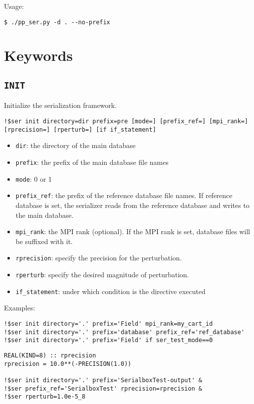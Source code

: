 \documentclass{article}
\begin{document}
Usage:
\begin{lstlisting}
$ ./pp_ser.py -d . --no-prefix
\end{lstlisting}

\section{Keywords}

\subsection{\texttt{INIT}}
Initialize the serialization framework.

\begin{lstlisting}
!$ser init directory=dir prefix=pre [mode=] [prefix_ref=] [mpi_rank=] [rprecision=] [rperturb=] [if if_statement]
\end{lstlisting}

\begin{itemize}
\item \texttt{dir}: the directory of the main database
\item \texttt{prefix}: the prefix of the main database file names
\item \texttt{mode}: 0 or 1
\item \texttt{prefix\_ref}: the prefix of the reference database file names. If reference database is set, the serializer reads from the reference database and writes to the main database.
\item \texttt{mpi\_rank}: the MPI rank (optional). If the MPI rank is set, database files will be suffixed with it. 
\item \texttt{rprecision}: specify the precision for the perturbation.
\item \texttt{rperturb}: specify the desired magnitude of perturbation.
\item \texttt{if\_statement}: under which condition is the directive executed
\end{itemize}

Examples:
\begin{lstlisting}
!$ser init directory='.' prefix='Field' mpi_rank=my_cart_id
!$ser init directory='.' prefix='database' prefix_ref='ref_database'
!$ser init directory='.' prefix='Field' if ser_test_mode==0
\end{lstlisting}

\begin{lstlisting}
REAL(KIND=8) :: rprecision
rprecision = 10.0**(-PRECISION(1.0))

!$ser init directory='.' prefix='SerialboxTest-output' &
!$ser prefix_ref='SerialboxTest' rprecision=rprecision &
!$ser rperturb=1.0e-5_8
\end{lstlisting}
\end{document}
